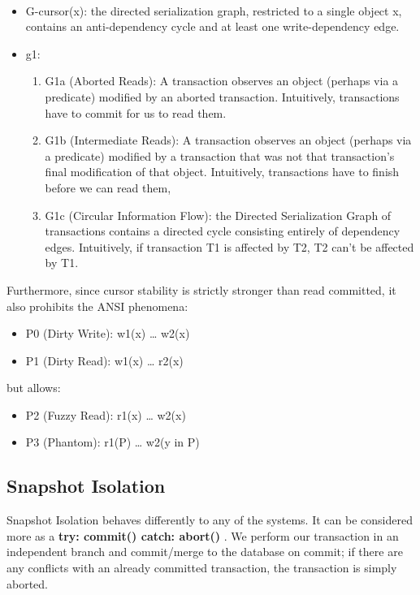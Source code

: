 \documentclass[a4paper,10pt,titlepage]{report}
\begin{document}
    \cite{Adya99weakconsistency}\\
    \begin{itemize}
        \item G-cursor(x): the directed serialization graph, restricted to a single object x, contains an anti-dependency cycle and at least one write-dependency edge.
        \item g1:
        \begin{enumerate}
            \item G1a (Aborted Reads): A transaction observes an object (perhaps via a predicate) modified by an aborted transaction. Intuitively, transactions have to commit for us to read them.
            \item G1b (Intermediate Reads): A transaction observes an object (perhaps via a predicate) modified by a transaction that was not that transaction's final modification of that object. Intuitively, transactions have to finish before we can read them,
            \item G1c (Circular Information Flow): the Directed Serialization Graph of transactions contains a directed cycle consisting entirely of dependency edges. Intuitively, if transaction T1 is affected by T2, T2 can't be affected by T1.
        \end{enumerate}
    \end{itemize}
    Furthermore, since cursor stability is strictly stronger than read committed, it also prohibits the ANSI phenomena:
    \begin{itemize}
        \item P0 (Dirty Write): w1(x) … w2(x)
        \item P1 (Dirty Read): w1(x) … r2(x)
    \end{itemize}

    but allows:
    \begin{itemize}
        \item P2 (Fuzzy Read): r1(x) … w2(x)
        \item P3 (Phantom): r1(P) … w2(y in P)
    \end{itemize}



    \subsection{Snapshot Isolation}


    Snapshot Isolation behaves differently to any of the systems. It can be considered more as a \textbf{try: commit() catch: abort()} . We perform our transaction in an independent branch and commit/merge to the database on commit; if there are any conflicts with an already committed transaction, the transaction is simply aborted.
\end{document}

